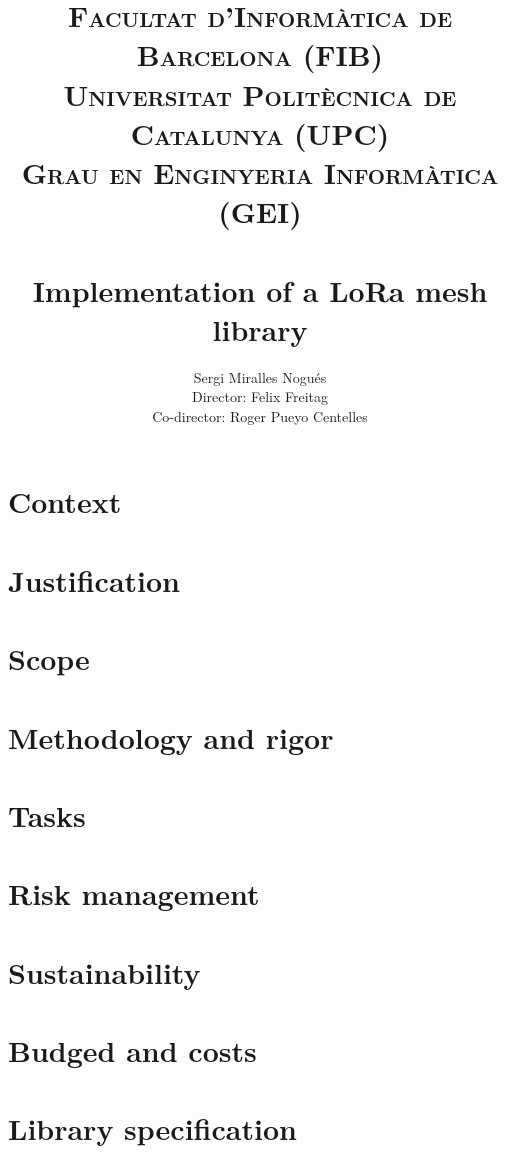 \documentclass[11pt,a4paper,titlepage]{article}
\author{ \LARGE Sergi Miralles Nogués\vspace{4mm} \\ Director: Felix Freitag  \\ Co-director: Roger Pueyo Centelles}
\title{\vspace{-15mm}\textsc{\Large Facultat d'Informàtica de Barcelona (FIB)}\\\textsc{\Large Universitat Politècnica de Catalunya (UPC)\vspace{5mm}}\\\textsc{\large Grau en Enginyeria Informàtica (GEI)}\\\textsc{\large}\\{\vspace{30mm}\huge \bfseries \fontfamily{lmss}\selectfont Implementation of a LoRa mesh library}  \\ { \LARGE \textsc{}}}
\begin{document}
	\maketitle
    
    \tableofcontents
    
    \newpage
    
    \section{Context}
    
    \section{Justification}
    
    \section{Scope}
    
    \section{Methodology and rigor}
    
    \section{Tasks}
    
    \section{Risk management}
    
    \section{Sustainability}
    
    \section{Budged and costs}
    
    \section{Library specification}
\end{document}
